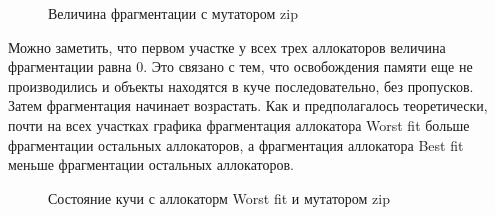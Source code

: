    \begin{figure}[h]
   \caption{Величина фрагментации с мутатором zip}
   \label{ris:image}
   \end{figure}
   
   Можно заметить, что первом участке у всех трех аллокаторов величина фрагментации равна 0. Это связано с тем, что освобождения памяти еще не 
производились и объекты находятся в куче последовательно, без пропусков. Затем фрагментация начинает возрастать. Как и 
предполагалось теоретически, почти на всех участках графика фрагментация аллокатора Worst fit больше фрагментации остальных 
аллокаторов, а фрагментация аллокатора Best fit меньше фрагментации остальных аллокаторов.
   
   \begin{figure}[p]
   \caption{Состояние кучи с аллокаторм Worst fit и мутатором zip}
   \label{ris:image2}
   \end{figure}
   
